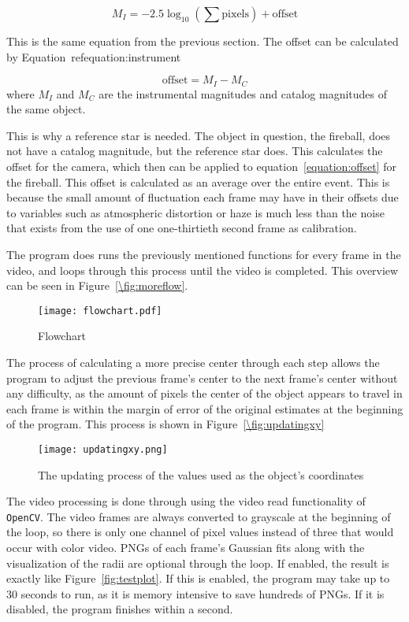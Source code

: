 \begin{equation}
	M_I = -2.5 \log_{10}\left( \sum \text{pixels}\right) + \text{offset}
	\label{equation:instrument}
\end{equation}

This is the same equation from the previous section. The offset can be calculated by Equation~ref{equation:instrument}

\begin{equation}
	\text{offset} = M_I - M_C
	\label{equation:offset}
\end{equation}
where $M_I$ and $M_C$ are the instrumental magnitudes and catalog magnitudes of the same object.

This is why a reference star is needed. The object in question, the fireball, does not have a catalog magnitude, but the reference star does. This calculates the offset for the camera, which then can be applied to equation~\ref{equation:offset} for the fireball. This offset is calculated as an average over the entire event. This is because the small amount of fluctuation each frame may have in their offsets due to variables such as atmospheric distortion or haze is much less than the noise that exists from the use of one one-thirtieth second frame as calibration.

The program does runs the previously mentioned functions for every frame in the video, and loops through this process until the video is completed. This overview can be seen in Figure~\ref{\fig:moreflow}.

\begin{figure}[ht!]
	\centering
	\texttt{[image: flowchart.pdf]}
	\caption{Flowchart}
	\label{fig:moreflow}
\end{figure}

The process of calculating a more precise center through each step allows the program to adjust the previous frame's center to the next frame's center without any difficulty, as the amount of pixels the center of the object appears to travel in each frame is within the margin of error of the original estimates at the beginning of the program. This process is shown in Figure~\ref{\fig:updatingxy}

\begin{figure}[htpb]
	\centering
	\texttt{[image: updatingxy.png]}
	\caption{The updating process of the values used as the object's coordinates}
	\label{fig:updatingxy}
\end{figure}

The video processing is done through using the video read functionality of \texttt{OpenCV}. The video frames are always converted to grayscale at the beginning of the loop, so there is only one channel of pixel values instead of three that would occur with color video.  PNGs of each frame's Gaussian fits along with the visualization of the radii are optional through the loop. If enabled, the result is exactly like Figure~\ref{fig:testplot}. If this is enabled, the program may take up to 30 seconds to run, as it is memory intensive to save hundreds of PNGs. If it is disabled, the program finishes within a second.




